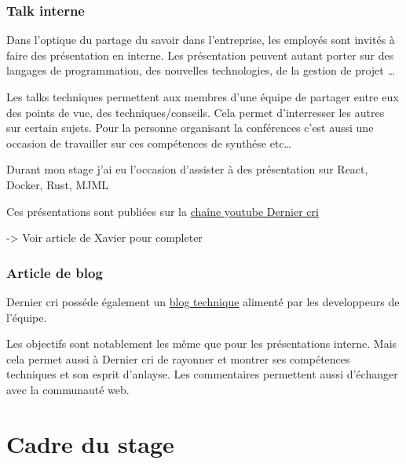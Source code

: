 \bigskip

\subsubsection{Talk interne}\label{talk-interne}

\bigskip

Dans l'optique du partage du savoir dans l'entreprise, les employés sont
invités à faire des présentation en interne. Les présentation peuvent
autant porter sur des langages de programmation, des nouvelles
technologies, de la gestion de projet \ldots{}

\bigskip

Les talks techniques permettent aux membres d'une équipe de partager
entre eux des points de vue, des techniques/conseils. Cela permet
d'interresser les autres sur certain sujets. Pour la personne organisant
la conférences c'est aussi une occasion de travailler sur ces
compétences de synthése etc\ldots{}

\bigskip

Durant mon stage j'ai eu l'occasion d'assister à des présentation sur
React, Docker, Rust, MJML

\bigskip

Ces présentations sont publiées sur la
\href{https://www.youtube.com/channel/UCDfdBlzldhg_PEu3xZTPsHg}{chaîne
youtube Dernier cri}

\bigskip

-\textgreater{} Voir article de Xavier pour completer

\subsubsection{Article de blog}\label{article-de-blog}

\bigskip

Dernier cri posséde également un
\href{http://derniercri.io/tech-blog}{blog technique} alimenté par les
developpeurs de l'équipe.

\bigskip

Les objectifs sont notablement les même que pour les présentations
interne. Mais cela permet aussi à Dernier cri de rayonner et montrer ses
compétences techniques et son esprit d'anlayse. Les commentaires
permettent aussi d'échanger avec la communauté web.

\newpage

\section{Cadre du stage}\label{cadre-du-stage}

